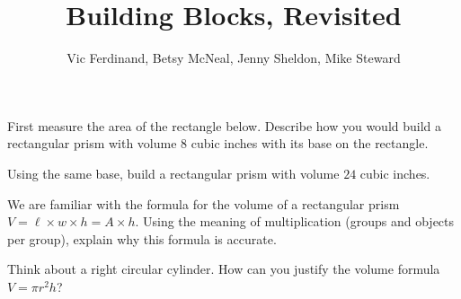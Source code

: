 \documentclass[nooutcomes]{ximera}
\title{Building Blocks, Revisited}
\author{Vic Ferdinand, Betsy McNeal, Jenny Sheldon, Mike Steward}
\begin{document}
\begin{abstract}
\end{abstract}
\maketitle




\begin{problem}
First measure the area of the rectangle below.  Describe how you would build a rectangular prism with volume $8$ cubic inches with its base on the rectangle.


\end{problem}

\begin{problem}
Using the same base, build a rectangular prism with volume $24$ cubic inches.

\end{problem}


\begin{problem}
We are familiar with the formula for the volume of a rectangular prism $V = \ell \times w \times h = A \times h$.  Using the meaning of multiplication (groups and objects per group), explain why this formula is accurate.


\end{problem}

\begin{problem} 
Think about a right circular cylinder.  How can you justify the volume formula $V = \pi r^2 h$?


\end{problem}

\newpage
\end{document}
